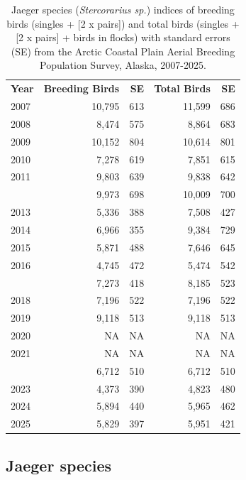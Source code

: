 \documentclass[
]{article}
\begin{document}
\begin{longtable}[t]{lrrrr}

\caption{\label{tbl-JAEG}Jaeger species (\emph{Stercorarius sp.})
indices of breeding birds (singles + {[}2 x pairs{]}) and total birds
(singles + {[}2 x pairs{]} + birds in flocks) with standard errors (SE)
from the Arctic Coastal Plain Aerial Breeding Population Survey, Alaska,
2007-2025.}

\tabularnewline

\\
\toprule
\textbf{Year} & \textbf{Breeding Birds} & \textbf{SE} & \textbf{Total Birds} & \textbf{SE}\\
\midrule
2007 & 10,795 & 613 & 11,599 & 686\\
2008 & 8,474 & 575 & 8,864 & 683\\
2009 & 10,152 & 804 & 10,614 & 801\\
2010 & 7,278 & 619 & 7,851 & 615\\
2011 & 9,803 & 639 & 9,838 & 642\\
\addlinespace
2012 & 9,973 & 698 & 10,009 & 700\\
2013 & 5,336 & 388 & 7,508 & 427\\
2014 & 6,966 & 355 & 9,384 & 729\\
2015 & 5,871 & 488 & 7,646 & 645\\
2016 & 4,745 & 472 & 5,474 & 542\\
\addlinespace
2017 & 7,273 & 418 & 8,185 & 523\\
2018 & 7,196 & 522 & 7,196 & 522\\
2019 & 9,118 & 513 & 9,118 & 513\\
2020 & NA & NA & NA & NA\\
2021 & NA & NA & NA & NA\\
\addlinespace
2022 & 6,712 & 510 & 6,712 & 510\\
2023 & 4,373 & 390 & 4,823 & 480\\
2024 & 5,894 & 440 & 5,965 & 462\\
2025 & 5,829 & 397 & 5,951 & 421\\
\bottomrule

\end{longtable}

\endgroup{}

\newpage{}

\subsection*{Jaeger species}\label{jaeger-species-2}
\end{document}
